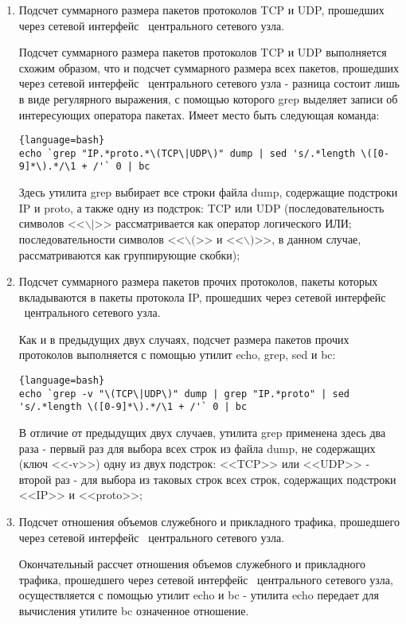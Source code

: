 \begin{enumerate}
		\item Подсчет суммарного размера пакетов протоколов TCP и UDP, прошедших через сетевой интерфейс
		\midethf\ центрального сетевого узла.

		Подсчет суммарного размера пакетов протоколов TCP и UDP выполняется схожим образом, что и подсчет суммарного
		размера всех пакетов, прошедших через сетевой интерфейс \midethf\ центрального сетевого узла - разница состоит
		лишь в виде регулярного выражения, с помощью которого grep выделяет записи
		об интересующих оператора пакетах. Имеет место быть следующая команда:

		\begin{lstlisting}{language=bash}
echo `grep "IP.*proto.*\(TCP\|UDP\)" dump | sed 's/.*length \([0-9]*\).*/\1 + /'` 0 | bc
		\end{lstlisting}

		Здесь утилита grep выбирает все строки файла dump, содержащие подстроки IP и proto, а также одну из подстрок:
		TCP или UDP (последовательность	символов <<$\backslash|$>> рассматривается как оператор логического ИЛИ;
		последовательности символов <<$\backslash($>> и <<$\backslash)$>>, в данном случае, рассматриваются как
		группирующие скобки);

		\item Подсчет суммарного размера пакетов прочих протоколов, пакеты которых вкладываются в пакеты протокола IP,
		прошедших через сетевой интерфейс \midethf\ центрального сетевого узла.

		Как и в предыдущих двух случаях, подсчет размера пакетов прочих протоколов выполняется с помощью утилит echo,
		grep, sed и bc:

		\begin{lstlisting}{language=bash}
echo `grep -v "\(TCP\|UDP\)" dump | grep "IP.*proto" | sed 's/.*length \([0-9]*\).*/\1 + /'` 0 | bc
		\end{lstlisting}

		В отличие от предыдущих двух случаев, утилита grep применена здесь два раза - первый раз для выбора всех строк
		из файла dump, не содержащих (ключ <<-v>>) одну из двух подстрок: <<TCP>> или <<UDP>> - второй раз -
		для выбора из таковых строк всех строк, содержащих подстроки <<IP>> и <<proto>>;

		\item Подсчет отношения объемов служебного и прикладного трафика, прошедшего через сетевой интерфейс
		\midethf\ центрального сетевого узла.

		Окончательный рассчет отношения объемов служебного и прикладного трафика, прошедшего через сетевой интерфейс
		\midethf\ центрального сетевого узла, осуществляется с помощью утилит echo и bc - утилита echo передает для
		вычисления утилите bc означенное отношение.

	\end{enumerate}

